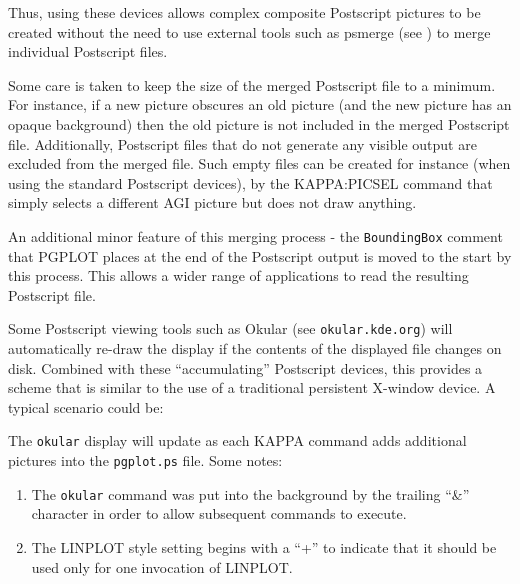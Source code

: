 \documentclass[twoside,11pt]{starlink}
\begin{document}
Thus, using these devices allows complex composite Postscript pictures to
be created without the need to use external tools such as psmerge (see
) to merge individual Postscript files.

Some care is taken to keep the size of the merged Postscript file to a
minimum. For instance, if a new picture obscures an old picture (and the
new picture has an opaque background) then the old picture is not
included in the merged Postscript file. Additionally, Postscript files
that do not generate any visible output are excluded from the merged
file. Such empty files can be created for instance (when using the
standard Postscript devices), by the KAPPA:PICSEL command that simply
selects a different AGI picture but does not draw anything.

An additional minor feature of this merging process - the {\tt BoundingBox}
comment that PGPLOT places at the end of the Postscript output is moved
to the start by this process. This allows a wider range of applications
to read the resulting Postscript file.

Some Postscript viewing tools such as Okular (see {\tt okular.kde.org}) will
automatically re-draw the display if the contents of the displayed file
changes on disk. Combined with these ``accumulating'' Postscript devices,
this provides a scheme that is similar to the use of a traditional
persistent X-window device. A typical scenario could be:

\begin{terminalv}
\end{terminalv}

The {\tt okular} display will update as each KAPPA command adds additional
pictures into the {\tt pgplot.ps} file. Some notes:

\begin{enumerate}
\item The {\tt okular} command was put into the background by the trailing
``\&'' character in order to allow subsequent commands to execute.
\item The LINPLOT style setting begins with a ``+'' to indicate that it
should be used only for one invocation of LINPLOT.
\end{enumerate}
\end{document}
